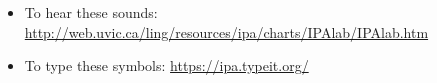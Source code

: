 \begin{itemize}
  \item To hear these sounds: \url{http://web.uvic.ca/ling/resources/ipa/charts/IPAlab/IPAlab.htm}
  \item To type these symbols: \url{https://ipa.typeit.org/}
\end{itemize}
